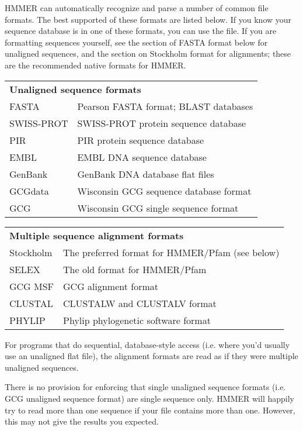 HMMER can automatically recognize and parse a number of common file
formats. The best supported of these formats are listed below. If you
know your sequence database is in one of these formats, you can use
the file. If you are formatting sequences yourself, see the section of
FASTA format below for unaligned sequences, and the section on
Stockholm format for alignments; these are the recommended native
formats for HMMER.

\begin{tabular}{ll}
\multicolumn{2}{l}{\textbf{Unaligned sequence formats}} \\
FASTA      & Pearson FASTA format; BLAST databases \\
SWISS-PROT & SWISS-PROT protein sequence database\\ 
PIR        & PIR protein sequence database \\
EMBL       & EMBL DNA sequence database \\
GenBank    & GenBank DNA database flat files\\
GCGdata    & Wisconsin GCG sequence database format \\
GCG        & Wisconsin GCG single sequence format \\
\end{tabular}

\begin{tabular}{ll}
\multicolumn{2}{l}{\textbf{Multiple sequence alignment formats}}\\
Stockholm & The preferred format for HMMER/Pfam (see below)\\
SELEX     & The old format for HMMER/Pfam\\
GCG MSF   &   GCG alignment format \\
CLUSTAL   &   CLUSTALW and CLUSTALV format \\
PHYLIP    &   Phylip phylogenetic software format \\
\end{tabular}

For programs that do sequential, database-style access (i.e.  where
you'd usually use an unaligned flat file), the alignment formats are
read as if they were multiple unaligned sequences.

There is no provision for enforcing that single unaligned sequence
formats (i.e. GCG unaligned sequence format) are single sequence
only. HMMER will happily try to read more than one sequence if your
file contains more than one. However, this may not give the results
you expected.

